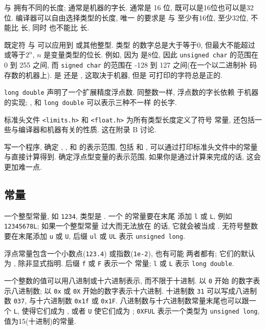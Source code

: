 \cshort 与 \clong 拥有不同的长度; \cint 通常是机器的字长. \cshort 通常是 
16 位, \cint 既可以是16位也可以是32位. 编译器可以自由选择类型的长度, 唯一
的要求是 \cshort 与 \cint 至少有16位, \clong 至少32位, \cshort 不能比 \cint 
长, 同时 \cint 也不能比 \clong 长.

既定符 \csigned 与 \cunsigned 可以应用到 \cchar 或其他整型. \cunsigned 类型
的数字总是大于等于0, 但最大不能超过或等于$2^n$, $n$ 是变量类型的位长. 
例如, 因为 \cchar 是8位, 因此 \texttt{unsigned char} 的范围在 0 到 255
之间, 而 \texttt{signed char} 的范围在 -128 到 127 之间(在一个以二进制补
码存数的机器上). \cchar 是 \csigned 还是 \cunsigned, 这取决于机器, 但是 
可打印的字符总是正的.

\texttt{long double} 声明了一个扩展精度浮点数. 同整数一样, 浮点数的字长依赖
于机器的实现; \cfloat, \cdouble 和 \texttt{long double} 可以表示三种不一样
的长字.

标准头文件 \texttt{<limits.h>} 和 \texttt{<float.h>} 为所有类型长度定义了符号
常量, 还包括一些与编译器和机器有关的性质. 这在附录 B 讨论.

\exercise 写一个程序, 确定 \cchar, \cshort, \cint 和 \clong 的表示范围,
包括 \csigned 和 \cunsigned, 可以通过打印标准头文件中的常量与直接计算得到.
确定浮点型变量的表示范围, 如果你是通过计算来完成的话, 这会更加难一点.

\subsection{常量}
一个整型常量, 如 \texttt{1234}, 类型是 \cint. 一个 \clong 的常量要在末尾
添加 \texttt{l} 或 \texttt{L}, 例如 \texttt{12345678L}; 如果一个整型常量
过大而无法放在 \cint 的话, 它就会被当成 \clong. 无符号整数要在末尾添加
\texttt{u} 或 \texttt{U}, 后缀 \texttt{ul} 或 \texttt{UL} 表示 
\texttt{unsigned long}.

浮点常量包含一个小数点(\texttt{123.4}) 或指数(\texttt{1e-2}), 也有可能
两者都有; 它们的默认为 \cdouble, 除非显式指明. 后缀 \texttt{f} 或 
\texttt{F} 表示一个 \cfloat 常量; \texttt{l} 或 \texttt{L} 表示 
\texttt{long double}.

一个整数的值可以用八进制或十六进制表示, 而不限于十进制. 以 \texttt{0} 开始
的数字表示八进制数; 以 \texttt{0x} 或 \texttt{0X} 开始的数字表示十六进制.
十进制数 \texttt{31} 可以写成八进制数 \texttt{037}, 与十六进制数
\texttt{0x1f} 或 \texttt{0x1F}. 八进制数与十六进制数常量末尾也可以跟一个
\texttt{L}, 使得它们成为 \clong, 或者 \texttt{U} 使它们成为 \cunsigned;
\texttt{0XFUL} 表示一个类型为 \texttt{unsigned long}, 值为15(十进制)的常量.

